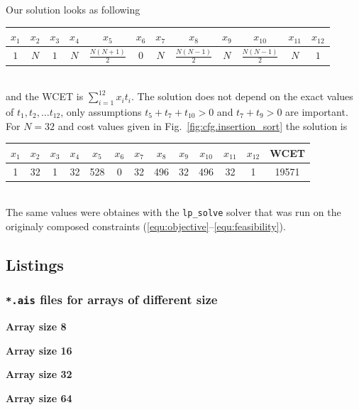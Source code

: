 \documentclass[12pt,a4paper,titlepage,oneside]{article}
\begin{document}
\begin{itemize}
Our solution looks as following\\
\begin{tabular}{c|c|c|c|c|c|c|c|c|c|c|c}
\hline
$x_1$ & $x_2$ & $x_3$ & $x_4$ & $x_5$ & $x_6$ & $x_7$ & $x_8$ & $x_9$ & $x_{10}$ & $x_{11}$ & $x_{12}$ \\
\hline
$1$ & $N$ & $1$ & $N$ & $\frac{N(N+1)}2$ & $0$ & $N$ & $\frac{N(N-1)}2$ & $N$ & $\frac{N(N-1)}2$ & $N$ & $1$ \\
\hline
\end{tabular}\\
and the WCET is $\sum_{i=1}^{12} x_i t_i$.
The solution does not depend on the exact values of $t_1, t_2, \ldots t_{12}$, only assumptions $t_5 + t_7 + t_{10} > 0$ and $t_7+t_9 > 0$ are important.
For $N=32$ and cost values given in Fig.~\ref{fig:cfg.insertion_sort} the solution is\\
\begin{tabular}{c|c|c|c|c|c|c|c|c|c|c|c|c}
\hline
$x_1$ & $x_2$ & $x_3$ & $x_4$ & $x_5$ & $x_6$ & $x_7$ & $x_8$ & $x_9$ & $x_{10}$ & $x_{11}$ & $x_{12}$ & WCET\\
\hline
1 & 32 & 1 & 32 & 528 & 0 & 32 & 496 & 32 & 496 & 32 & 1  & 19571\\
\hline
\end{tabular}\\
The same values were obtaines with the \texttt{lp\_solve} solver that was run on the originaly composed constraints (\ref{equ:objective}--\ref{equ:feasibility}).

\end{itemize}



\subsection{Listings}

\subsubsection{\texttt{*.ais} files for arrays of different size}
\textbf{Array size 8}


\textbf{Array size 16}

\textbf{Array size 32}

\textbf{Array size 64}

\end{document}
